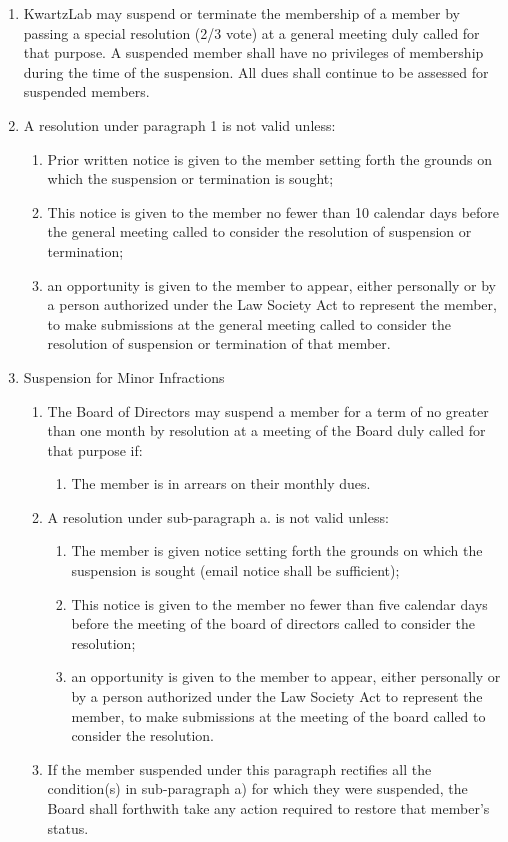 \documentclass{article}
\begin{document}
\begin{enumerate}
\item KwartzLab may suspend or terminate the membership of a member by passing a special resolution (2/3 vote) at a general meeting duly called for that purpose. A suspended member shall have no privileges of membership during the time of the suspension. All dues shall continue to be assessed for suspended members.
\item A resolution under paragraph 1 is not valid unless:
	\begin{enumerate}
	\item Prior written notice is given to the member setting forth the grounds on which the suspension or termination is sought;
	\item This notice is given to the member no fewer than 10 calendar days before the general meeting called to consider the resolution of suspension or termination;
	\item an opportunity is given to the member to appear, either personally or by a person authorized under the Law Society Act to represent the member, to make submissions at the general meeting called to consider the resolution of suspension or termination of that member.
	\end{enumerate}
\item Suspension for Minor Infractions
	\begin{enumerate}
	\item The Board of Directors may suspend a member for a term of no greater than one month by resolution at a meeting of the Board duly called for that purpose if:
		\begin{enumerate}
		\item The member is in arrears on their monthly dues.
		\end{enumerate}
	\item A resolution under sub-paragraph a. is not valid unless:
		\begin{enumerate}
		\item The member is given notice setting forth the grounds on which the suspension is sought (email notice shall be sufficient);
		\item This notice is given to the member no fewer than five calendar days before the meeting of the board of directors called to consider the resolution;
		\item an opportunity is given to the member to appear, either personally or by a person authorized under the Law Society Act to represent the member, to make submissions at the meeting of the board called to consider the resolution.
		\end{enumerate}
	\item If the member suspended under this paragraph rectifies all the condition(s) in sub-paragraph a) for which they were suspended, the Board shall forthwith take any action required to restore that member's status.
	\end{enumerate}
\end{enumerate}
\end{document}
